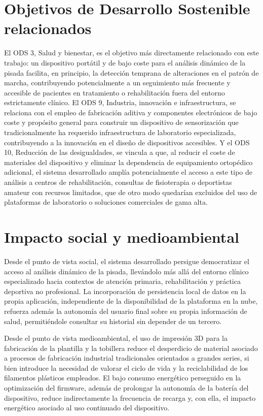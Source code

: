 \begin{IAtext}

\section{Objetivos de Desarrollo Sostenible relacionados}

El ODS 3, Salud y bienestar, es el objetivo más directamente relacionado con este trabajo: un dispositivo portátil y de bajo coste para el análisis dinámico de la pisada facilita, en principio, la detección temprana de alteraciones en el patrón de marcha, contribuyendo potencialmente a un seguimiento más frecuente y accesible de pacientes en tratamiento o rehabilitación fuera del entorno estrictamente clínico. El ODS 9, Industria, innovación e infraestructura, se relaciona con el empleo de fabricación aditiva y componentes electrónicos de bajo coste y propósito general para construir un dispositivo de sensorización que tradicionalmente ha requerido infraestructura de laboratorio especializada, contribuyendo a la innovación en el diseño de dispositivos accesibles. Y el ODS 10, Reducción de las desigualdades, se vincula a que, al reducir el coste de materiales del dispositivo y eliminar la dependencia de equipamiento ortopédico adicional, el sistema desarrollado amplía potencialmente el acceso a este tipo de análisis a centros de rehabilitación, consultas de fisioterapia o deportistas amateur con recursos limitados, que de otro modo quedarían excluidos del uso de plataformas de laboratorio o soluciones comerciales de gama alta.

\section{Impacto social y medioambiental}

Desde el punto de vista social, el sistema desarrollado persigue democratizar el acceso al análisis dinámico de la pisada, llevándolo más allá del entorno clínico especializado hacia contextos de atención primaria, rehabilitación y práctica deportiva no profesional. La incorporación de persistencia local de datos en la propia aplicación, independiente de la disponibilidad de la plataforma en la nube, refuerza además la autonomía del usuario final sobre su propia información de salud, permitiéndole consultar su historial sin depender de un tercero.

Desde el punto de vista medioambiental, el uso de impresión 3D para la fabricación de la plantilla y la tobillera reduce el desperdicio de material asociado a procesos de fabricación industrial tradicionales orientados a grandes series, si bien introduce la necesidad de valorar el ciclo de vida y la reciclabilidad de los filamentos plásticos empleados. El bajo consumo energético perseguido en la optimización del firmware, además de prolongar la autonomía de la batería del dispositivo, reduce indirectamente la frecuencia de recarga y, con ella, el impacto energético asociado al uso continuado del dispositivo.


\end{IAtext}
